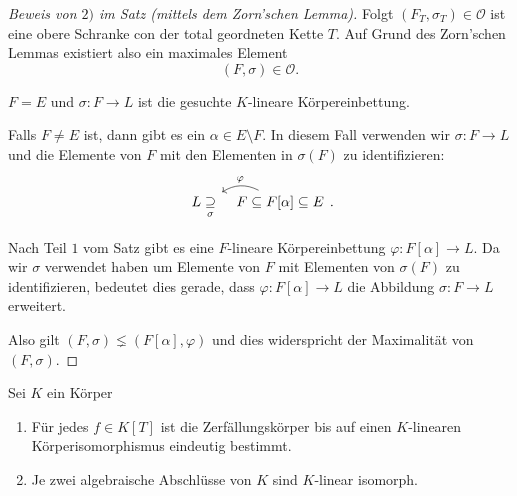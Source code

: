 \begin{proof}[Beweis von $2)$ im Satz (mittels dem Zorn'schen Lemma)]
	Folgt $(F_{T},\sigma_{T}) \in \mathcal{O}$ ist eine obere Schranke con der total geordneten Kette $T$.
	Auf Grund des Zorn'schen Lemmas existiert also ein maximales Element
	\[
		(F,\sigma) \in \mathcal{O}
	.\] 
	\begin{claim}
		$F = E$ und $\sigma : F  \to L$ ist die gesuchte $K$-lineare Körpereinbettung.
	\end{claim}
	Falls $F \neq E$ ist, dann gibt es ein $\alpha \in E \setminus F$. In diesem Fall verwenden wir $\sigma: F \to L$ und die Elemente von
	$F$ mit den Elementen in $\sigma(F)$ zu identifizieren:
	\[
		\begin{tikzcd}[column sep=tiny]
			L \underset{\sigma}{\supseteq} & F \subseteq F[\alpha] \subseteq E \arrow[l, "\varphi"', bend right] %
\end{tikzcd}
	.\] 

	Nach Teil $1$ vom Satz gibt es eine $F$-lineare Körpereinbettung $\varphi: F[\alpha] \to L$.
	Da wir $\sigma$ verwendet haben um Elemente von  $F$ mit Elementen von $\sigma(F)$ zu identifizieren,
	bedeutet dies gerade, dass $\varphi: F[\alpha] \to L$ die Abbildung $\sigma: F \to L$ erweitert.

	Also gilt $(F,\sigma) \lneq (F[\alpha],\varphi)$ und dies widerspricht der Maximalität von $(F,\sigma)$.
\end{proof}

\begin{corollary}
	Sei $K$ ein Körper
	\begin{enumerate}[1)]
		\item Für jedes $f \in K[T]$ ist die Zerfällungskörper bis auf einen $K$-linearen Körperisomorphismus eindeutig bestimmt.
		\item Je zwei algebraische Abschlüsse von $K$ sind $K$-linear isomorph.
	\end{enumerate}
\end{corollary}

